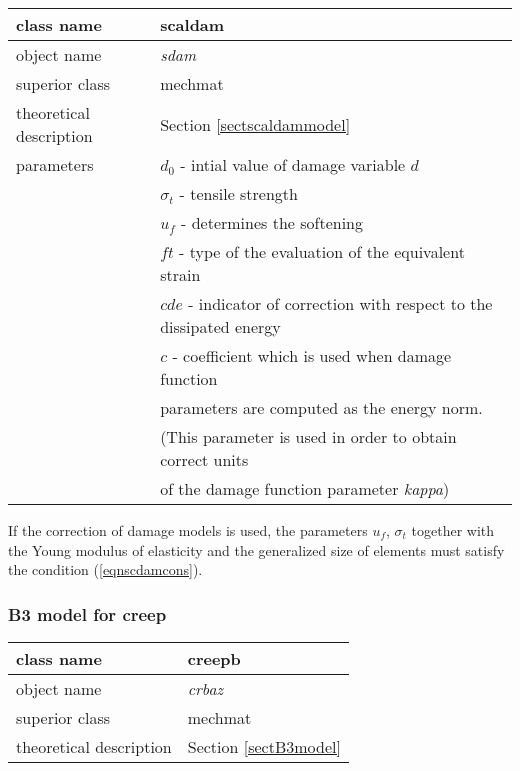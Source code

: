 \begin{center}
\begin{tabular}{|l|l|}
\hline
class name & {\sf scaldam}\index{class!{\sf scaldam}}
\\ \hline
object name & {\it sdam}\index{instance!{\it sdam}}
\\ \hline
superior class & {\sf mechmat}
\\ \hline
theoretical description & Section \ref{sectscaldammodel}
\\ \hline
parameters & $d_0$ - intial value of damage variable $d$
\\
 & $\sigma_t$ - tensile strength
\\
 & $u_f$ - determines the softening
\\
 & $ft$ - type of the evaluation of the equivalent strain
\\
 & $cde$ - indicator of correction with respect to the dissipated energy
\\
 & $c$  - coefficient which is used when damage function
\\
 & parameters are computed as the energy norm.
\\
 & (This parameter is used in order to obtain correct units
\\
 & of the damage function parameter {\it kappa})
\\ \hline
\end{tabular}
\end{center}

If the correction of damage models is used, the parameters $u_f$, $\sigma_t$ together with the Young
modulus of elasticity and the generalized size of elements must satisfy the condition (\ref{eqnscdamcons}).

\subsubsection{B3 model for creep}

\begin{center}
\begin{tabular}{|l|l|}
\hline
class name & {\sf creepb}\index{class!{\sf creepb}}
\\ \hline
object name & {\it crbaz}\index{instance!{\it crbaz}}
\\ \hline
superior class & {\sf mechmat}
\\ \hline
theoretical description & Section \ref{sectB3model}
\\ \hline
\end{tabular}
\end{center}

